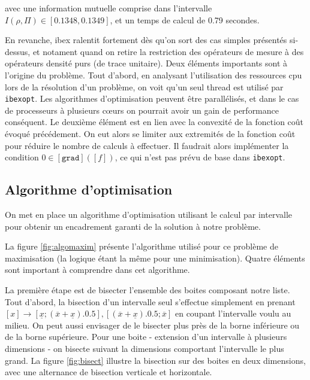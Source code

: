 \documentclass[12pt,a4paper]{article}
\begin{document}
    avec une information mutuelle comprise dans l'intervalle $I(\rho, \Pi) \in [0.1348, 0.1349]$, et un temps de calcul de 0.79 secondes.


    En revanche, ibex ralentit fortement dès qu'on sort des cas simples présentés si-dessus, et notament quand on retire la restriction des opérateurs de mesure à des opérateurs densité purs (de trace unitaire). Deux éléments importants sont à l'origine du problème. Tout d'abord, en analysant l'utilisation des ressources cpu lors de la résolution d'un problème, on voit qu'un seul thread est utilisé par \texttt{ibexopt}. Les algorithmes d'optimisation peuvent être parallélisés, et dans le cas de processeurs à plusieurs c\oe urs on pourrait avoir un gain de performance conséquent. Le deuxième élément est en lien avec la convexité de la fonction coût évoqué précédement. On eut alors se limiter aux extremités de la fonction coût pour réduire le nombre de calculs à effectuer. Il faudrait alors implémenter la condition $0 \in [\texttt{grad}]([f])$, ce qui n'est pas prévu de base dans \texttt{ibexopt}.

    \subsection*{Algorithme d'optimisation}
    On met en place un algorithme d'optimisation utilisant le calcul par intervalle pour obtenir un encadrement garanti de la solution à notre problème.

    La figure \ref{fig:algomaxim} présente l'algorithme utilisé pour ce problème de maximisation (la logique étant la même pour une minimisation). Quatre éléments sont important à comprendre dans cet algorithme.

    La première étape est de bisecter l'ensemble des boites composant notre liste. Tout d'abord, la bisection d'un intervalle seul s'effectue simplement en prenant $[x] \longrightarrow {[\underline{x}; (\overline{x} + \underline{x}) . 0.5], [(\overline{x} + \underline{x}) . 0.5; \overline{x}]}$ en coupant l'intervalle voulu au milieu. On peut aussi envisager de le bisecter plus près de la borne inférieure ou de la borne supérieure. Pour une boite - extension d'un intervalle à plusieurs dimensions - on bisecte suivant la dimensions comportant l'intervalle le plus grand. La figure \ref{fig:bisect} illustre la bisection sur des boites en deux dimensions, avec une alternance de bisection verticale et horizontale.
\end{document}
